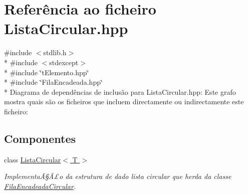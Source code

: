 \hypertarget{a00013}{\section{Referência ao ficheiro Lista\+Circular.\+hpp}
\label{a00013}
}
{\ttfamily \#include $<$stdlib.\+h$>$}\\*
{\ttfamily \#include $<$stdexcept$>$}\\*
{\ttfamily \#include \char`\"{}t\+Elemento.\+hpp\char`\"{}}\\*
{\ttfamily \#include \char`\"{}Fila\+Encadeada.\+hpp\char`\"{}}\\*
Diagrama de dependências de inclusão para Lista\+Circular.\+hpp\+:
Este grafo mostra quais são os ficheiros que incluem directamente ou indirectamente este ficheiro\+:
\subsection*{Componentes}
\begin{DoxyCompactItemize}
\item 
class \hyperlink{a00004}{Lista\+Circular$<$ T $>$}
\begin{DoxyCompactList}\small\item\em ImplementaÃ§Ã£o da estrutura de dado lista circular que herda da classe \hyperlink{a00003}{Fila\+Encadeada\+Circular}. \end{DoxyCompactList}\end{DoxyCompactItemize}
